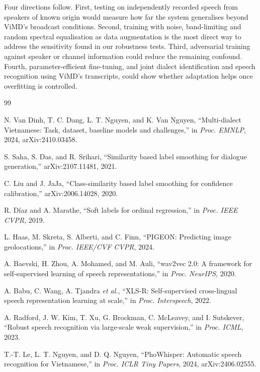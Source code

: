 \documentclass[conference]{IEEEtran}
\begin{document}
Four directions follow. First, testing on independently recorded speech from speakers of known origin would measure how far the system generalises beyond ViMD's broadcast conditions. Second, training with noise, band-limiting and random spectral equalisation as data augmentation is the most direct way to address the sensitivity found in our robustness tests. Third, adversarial training against speaker or channel information could reduce the remaining confound. Fourth, parameter-efficient fine-tuning, and joint dialect identification and speech recognition using ViMD's transcripts, could show whether adaptation helps once overfitting is controlled.

\begin{thebibliography}{99}

N. Van Dinh, T. C. Dang, L. T. Nguyen, and K. Van Nguyen, ``Multi-dialect Vietnamese: Task, dataset, baseline models and challenges,'' in \textit{Proc. EMNLP}, 2024, arXiv:2410.03458.

S. Saha, S. Das, and R. Srihari, ``Similarity based label smoothing for dialogue generation,'' arXiv:2107.11481, 2021.

C. Liu and J. JaJa, ``Class-similarity based label smoothing for confidence calibration,'' arXiv:2006.14028, 2020.

R. D\'iaz and A. Marathe, ``Soft labels for ordinal regression,'' in \textit{Proc. IEEE CVPR}, 2019.

L. Haas, M. Skreta, S. Alberti, and C. Finn, ``PIGEON: Predicting image geolocations,'' in \textit{Proc. IEEE/CVF CVPR}, 2024.

A. Baevski, H. Zhou, A. Mohamed, and M. Auli, ``wav2vec 2.0: A framework for self-supervised learning of speech representations,'' in \textit{Proc. NeurIPS}, 2020.

A. Babu, C. Wang, A. Tjandra \textit{et al.}, ``XLS-R: Self-supervised cross-lingual speech representation learning at scale,'' in \textit{Proc. Interspeech}, 2022.

A. Radford, J. W. Kim, T. Xu, G. Brockman, C. McLeavey, and I. Sutskever, ``Robust speech recognition via large-scale weak supervision,'' in \textit{Proc. ICML}, 2023.

T.-T. Le, L. T. Nguyen, and D. Q. Nguyen, ``PhoWhisper: Automatic speech recognition for Vietnamese,'' in \textit{Proc. ICLR Tiny Papers}, 2024, arXiv:2406.02555.


\end{thebibliography}
\end{document}

